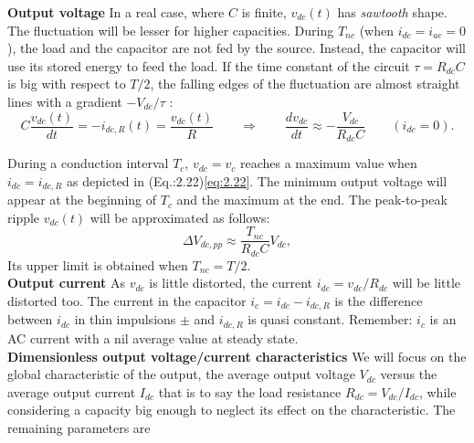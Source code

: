			\textbf{Output voltage} \qquad In a real case, where $C$ is finite, $v_{dc}(t)$ has \textit{sawtooth} shape. The fluctuation will be lesser for higher capacities. During $T_{nc}$ (when $i_{dc} =i_{ac} =0$), the load and the capacitor are not fed by the source. Instead, the capacitor will use its stored energy to feed the load. If the time constant of the circuit $\tau = R_{dc}C$ is big with respect to $T/2$, the falling edges of the fluctuation are almost straight lines with a gradient $-V_{dc}/\tau$ : 
			\begin{equation}
				C\frac{v_{dc}(t)}{dt} = -i_{dc,R}(t) = \frac{v_{dc}(t)}{R} \qquad \Rightarrow \qquad \frac{dv_{dc}}{dt} \approx - \frac{V_{dc}}{R_{dc}C} \qquad (i_{dc} = 0).
			\end{equation}
			
			During a conduction interval $T_c$, $v_{dc} = v_c$ reaches a maximum value when $i_{dc} = i_{dc,R}$ as depicted in (Eq.:2.22)\eqref{eq:2.22}. The minimum output voltage will appear at the beginning of $T_c$ and the maximum at the end. The peak-to-peak ripple $v_{dc}(t)$ will be approximated as follows:
			\begin{equation}
				\Delta V_{dc,pp} \approx \frac{T_{nc}}{R_{dc}C}V_{dc},
			\end{equation}
			Its upper limit is obtained when $T_{nc} = T/2$.
			\\
			
			\textbf{Output current} \qquad As $v_{dc}$ is little distorted, the current $i_{dc} = v_{dc}/R_{dc}$ will be little distorted too. The current in the capacitor $i_c = i_{dc}-i_{dc,R}$ is the difference between $i_{dc}$ in thin impulsions $\pm$ and $i_{dc,R}$ is quasi constant. Remember: $i_c$ is an AC current with a nil average value at steady state. 
			\\
			
			\textbf{Dimensionless output voltage/current characteristics} \qquad We will focus on the global characteristic of the output, the average output voltage $V_{dc}$ versus the average output current $I_{dc}$ that is to say the load resistance $R_{dc}=V_{dc}/I_{dc}$, while considering a capacity big enough to neglect its effect on the characteristic. The remaining parameters are 

